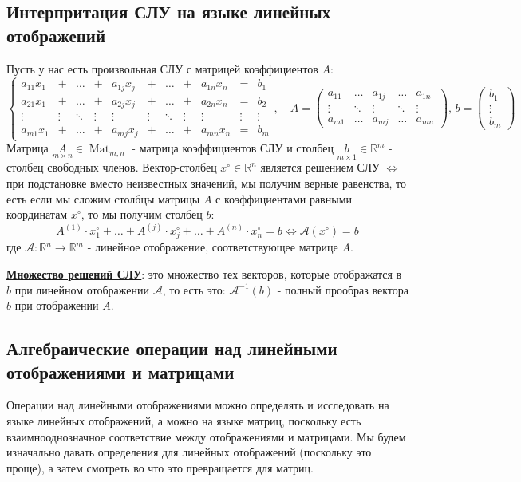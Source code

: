 \documentclass[12pt]{article}
\newcommand{\MR}{\mathbb{R}}
\newcommand{\MA}{\mathcal{A}}
\theoremstyle{definition}
\newcommand{\mat}[2]{\operatorname{Mat}_{#1, #2}}
\begin{document}
\subsection*{Интерпритация СЛУ на языке линейных отображений}
Пусть у нас есть произвольная СЛУ с матрицей коэффициентов $A$:
$$
	\left\{
	\begin{array}{ccccccccccc}
		a_{11}x_1 & + & \dotsc & + & a_{1j}x_j & + & \dotsc & + & a_{1n}x_n & = & b_1 \\
		a_{21}x_1 & + & \dotsc & + & a_{2j}x_j & + & \dotsc & + & a_{2n}x_n & = & b_2 \\
		\vdots & \vdots &\ddots & \vdots & \vdots & \vdots & \ddots & \vdots & \vdots & \vdots & \vdots \\ 
		a_{m1}x_1 & + & \dotsc & + & a_{mj}x_j & + & \dotsc & + & a_{mn}x_n & = & b_m 
	\end{array}
	\right., \quad
	A = 
	\begin{pmatrix}
		a_{11} & \dotsc & a_{1j} & \dotsc & a_{1n}\\
		\vdots & \ddots & \vdots & \ddots & \vdots \\
		a_{m1} & \dotsc & a_{mj} & \dotsc & a_{mn}
	\end{pmatrix}, \, 
	b = 
	\begin{pmatrix}
		b_1 \\
		\vdots \\
		b_m
	\end{pmatrix}
$$
Матрица $\underset{m \times n}{A} \in \mat{m}{n}$ - матрица коэффициентов СЛУ и столбец $\underset{m \times 1}{b} \in \MR^m$ - столбец свободных членов. Вектор-столбец $x^{\circ} \in \MR^n$ является решением СЛУ $\Leftrightarrow$ при подстановке вместо неизвестных значений, мы получим верные равенства, то есть если мы сложим столбцы матрицы $A$ с коэффициентами равными координатам $x^{\circ}$, то мы получим столбец $b$:
$$
	A^{(1)}{\cdot}x_1^{\circ}+ \dotsc + A^{(j)} {\cdot}x_j^{\circ} + \dotsc + A^{(n)}{\cdot}x_n^{\circ} = b \Leftrightarrow \MA(x^{\circ}) = b
$$
где $\MA \colon \MR^n \to \MR^m$ - линейное отображение, соответствующее матрице $A$.

\uline{\textbf{Множество решений СЛУ}}: это множество тех векторов, которые отображатся в $b$ при линейном отображении $\MA$, то есть это: $\MA^{-1}(b)$ - полный прообраз вектора $b$ при отображении $A$.

\subsection*{Алгебраические операции над линейными отображениями и матрицами}
Операции над линейными отображениями можно определять и исследовать на языке линейных отображений, а можно на языке матриц, поскольку есть взаимнооднозначное соответствие между отображениями и матрицами. Мы будем изначально давать определения для линейных отображений (поскольку это проще), а затем смотреть во что это превращается для матриц.
\end{document}
